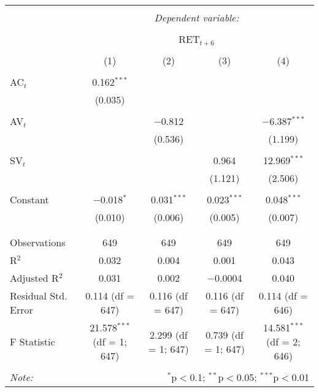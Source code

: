 
\begin{table}[!htbp] \centering 
  \caption{} 
  \label{} 
\begin{tabular}{@{\extracolsep{5pt}}lcccc} 
\\[-1.8ex]\hline 
\hline \\[-1.8ex] 
 & \multicolumn{4}{c}{\textit{Dependent variable:}} \\ 
\cline{2-5} 
\\[-1.8ex] & \multicolumn{4}{c}{RET$_{t+6}$} \\ 
\\[-1.8ex] & (1) & (2) & (3) & (4)\\ 
\hline \\[-1.8ex] 
 AC$_{t}$ & 0.162$^{***}$ &  &  &  \\ 
  & (0.035) &  &  &  \\ 
  & & & & \\ 
 AV$_{t}$ &  & $-$0.812 &  & $-$6.387$^{***}$ \\ 
  &  & (0.536) &  & (1.199) \\ 
  & & & & \\ 
 SV$_{t}$ &  &  & 0.964 & 12.969$^{***}$ \\ 
  &  &  & (1.121) & (2.506) \\ 
  & & & & \\ 
 Constant & $-$0.018$^{*}$ & 0.031$^{***}$ & 0.023$^{***}$ & 0.048$^{***}$ \\ 
  & (0.010) & (0.006) & (0.005) & (0.007) \\ 
  & & & & \\ 
\hline \\[-1.8ex] 
Observations & 649 & 649 & 649 & 649 \\ 
R$^{2}$ & 0.032 & 0.004 & 0.001 & 0.043 \\ 
Adjusted R$^{2}$ & 0.031 & 0.002 & $-$0.0004 & 0.040 \\ 
Residual Std. Error & 0.114 (df = 647) & 0.116 (df = 647) & 0.116 (df = 647) & 0.114 (df = 646) \\ 
F Statistic & 21.578$^{***}$ (df = 1; 647) & 2.299 (df = 1; 647) & 0.739 (df = 1; 647) & 14.581$^{***}$ (df = 2; 646) \\ 
\hline 
\hline \\[-1.8ex] 
\textit{Note:}  & \multicolumn{4}{r}{$^{*}$p$<$0.1; $^{**}$p$<$0.05; $^{***}$p$<$0.01} \\ 
\end{tabular} 
\end{table} 
